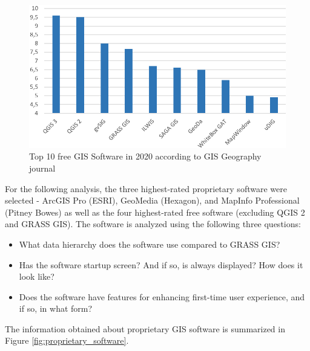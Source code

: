 \documentclass[a4paper,10pt,twoside]{article}
\begin{document}
\begin{figure}[hbt!] 
\begin{center}
\includegraphics[width=13cm]{../pictures/hodnoceni_free.png} 
\caption[Top 10 free GIS Software in 2020 according to GIS Geography journal]{Top 10 free GIS Software in 2020 according to GIS Geography journal \cite{gisgeography}}
\label{fig:hodnoceni_free}
\end{center}
\end{figure}

\noindent For the following analysis, the three highest-rated
proprietary software were selected - ArcGIS Pro (ESRI), GeoMedia
(Hexagon), and MapInfo Professional (Pitney Bowes) as well as the four
highest-rated free software (excluding QGIS 2 and GRASS
GIS). The software is analyzed using the following three questions:

\begin{itemize}
\item What data hierarchy does the software use compared to GRASS GIS?
\item Has the software startup screen? And if so, is always displayed? How does it look like? 
\item Does the software have features for enhancing first-time user experience, and if so, in what form?
\end{itemize}

\noindent The information obtained about proprietary GIS software is
summarized in Figure \ref{fig:proprietary_software}.
\end{document}
